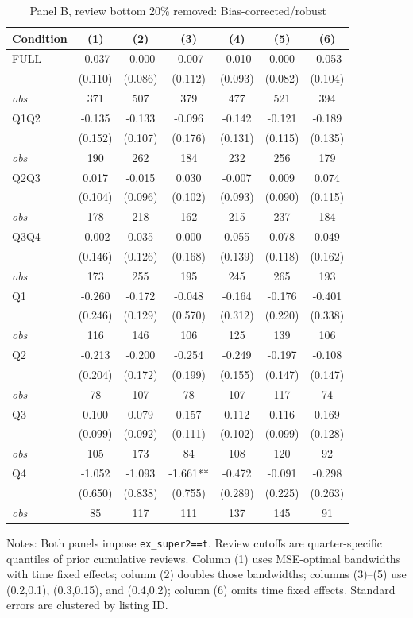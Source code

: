 \begin{table}[!htbp]
\centering
\caption{Panel B, review bottom 20\% removed: Bias-corrected/robust}
\begin{tabular}{lcccccc}
\toprule
Condition & (1) & (2) & (3) & (4) & (5) & (6) \\
\midrule
FULL & -0.037 & -0.000 & -0.007 & -0.010 & 0.000 & -0.053 \\
 & (0.110) & (0.086) & (0.112) & (0.093) & (0.082) & (0.104) \\
\textit{obs} & 371 & 507 & 379 & 477 & 521 & 394 \\
Q1Q2 & -0.135 & -0.133 & -0.096 & -0.142 & -0.121 & -0.189 \\
 & (0.152) & (0.107) & (0.176) & (0.131) & (0.115) & (0.135) \\
\textit{obs} & 190 & 262 & 184 & 232 & 256 & 179 \\
Q2Q3 & 0.017 & -0.015 & 0.030 & -0.007 & 0.009 & 0.074 \\
 & (0.104) & (0.096) & (0.102) & (0.093) & (0.090) & (0.115) \\
\textit{obs} & 178 & 218 & 162 & 215 & 237 & 184 \\
Q3Q4 & -0.002 & 0.035 & 0.000 & 0.055 & 0.078 & 0.049 \\
 & (0.146) & (0.126) & (0.168) & (0.139) & (0.118) & (0.162) \\
\textit{obs} & 173 & 255 & 195 & 245 & 265 & 193 \\
Q1 & -0.260 & -0.172 & -0.048 & -0.164 & -0.176 & -0.401 \\
 & (0.246) & (0.129) & (0.570) & (0.312) & (0.220) & (0.338) \\
\textit{obs} & 116 & 146 & 106 & 125 & 139 & 106 \\
Q2 & -0.213 & -0.200 & -0.254 & -0.249 & -0.197 & -0.108 \\
 & (0.204) & (0.172) & (0.199) & (0.155) & (0.147) & (0.147) \\
\textit{obs} & 78 & 107 & 78 & 107 & 117 & 74 \\
Q3 & 0.100 & 0.079 & 0.157 & 0.112 & 0.116 & 0.169 \\
 & (0.099) & (0.092) & (0.111) & (0.102) & (0.099) & (0.128) \\
\textit{obs} & 105 & 173 & 84 & 108 & 120 & 92 \\
Q4 & -1.052 & -1.093 & -1.661** & -0.472 & -0.091 & -0.298 \\
 & (0.650) & (0.838) & (0.755) & (0.289) & (0.225) & (0.263) \\
\textit{obs} & 85 & 117 & 111 & 137 & 145 & 91 \\
\bottomrule
\end{tabular}
\begin{minipage}{0.98\textwidth}\footnotesize
Notes: Both panels impose \texttt{ex\_super2==t}. Review cutoffs are quarter-specific quantiles of prior cumulative reviews. Column (1) uses MSE-optimal bandwidths with time fixed effects; column (2) doubles those bandwidths; columns (3)--(5) use (0.2,0.1), (0.3,0.15), and (0.4,0.2); column (6) omits time fixed effects. Standard errors are clustered by listing ID.
\end{minipage}
\end{table}

